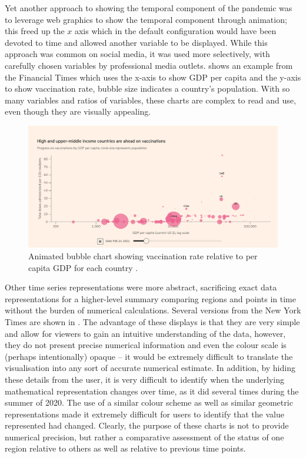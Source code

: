 \documentclass[article]{jdssv}\usepackage[]{graphicx}\usepackage[]{color}
\begin{document}
Yet another approach to showing the temporal component of the pandemic was to leverage web graphics to show the temporal component through animation; this freed up the $x$ axis which in the default configuration would have been devoted to time and allowed another variable to be displayed. While this approach was common on social media, it was used more selectively, with carefully chosen variables by professional media outlets.  shows an example from the Financial Times which uses the x-axis to show GDP per capita and the y-axis to show vaccination rate, bubble size indicates a country's population. With so many variables and ratios of variables, these charts are complex to read and use, even though they are visually appealing.

\begin{figure}
\centering
\includegraphics{ft_vaccine_bubble}
\caption{Animated bubble chart showing vaccination rate relative to per capita GDP for each country \citep{visualCovid19VaccineTracker}.}\label{fig:bubble-ft}
\end{figure}

Other time series representations were more abstract, sacrificing exact data representations for a higher-level summary comparing regions and points in time without the burden of numerical calculations. Several versions from the New York Times are shown in . The advantage of these displays is that they are very simple and allow for viewers to gain an intuitive understanding of the data, however, they do not present precise numerical information and even the colour scale is (perhaps intentionally) opaque -- it would be extremely difficult to translate the visualisation into any sort of accurate numerical estimate. In addition, by hiding these details from the user, it is very difficult to identify when the underlying mathematical representation changes over time, as it did several times during the summer of 2020. The use of a similar colour scheme as well as similar geometric representations made it extremely difficult for users to identify that the value represented had changed. Clearly, the purpose of these charts is not to provide numerical precision, but rather a comparative assessment of the status of one region relative to others as well as relative to previous time points. 
\end{document}

